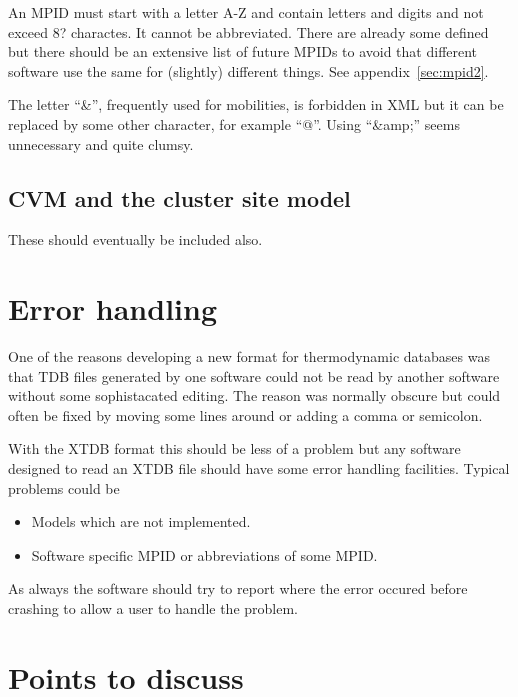 \documentclass{article}
\begin{document}
An MPID must start with a letter A-Z and contain letters and digits
and not exceed 8? charactes.  It cannot be abbreviated.  There are
already some defined but there should be an extensive list of future
MPIDs to avoid that different software use the same for (slightly)
different things.  See appendix~\ref{sec:mpid2}.
  
The letter ``\&'', frequently used for mobilities, is forbidden in XML
but it can be replaced by some other character, for example ``@''.
Using ``\&amp;'' seems unnecessary and quite clumsy.

\subsection{CVM and the cluster site model}

These should eventually be included also.


\section{Error handling}

One of the reasons developing a new format for thermodynamic databases
was that TDB files generated by one software could not be read by
another software without some sophistacated editing.  The reason was
normally obscure but could often be fixed by moving some lines around
or adding a comma or semicolon.

With the XTDB format this should be less of a problem but any software
designed to read an XTDB file should have some error handling
facilities.  Typical problems could be

\begin{itemize}
\item Models which are not implemented.
\item Software specific MPID or abbreviations of some MPID.
\end{itemize}

As always the software should try to report where the error occured
before crashing to allow a user to handle the problem.

\newpage 

\section{Points to discuss}\label{sec:points}
\end{document}

